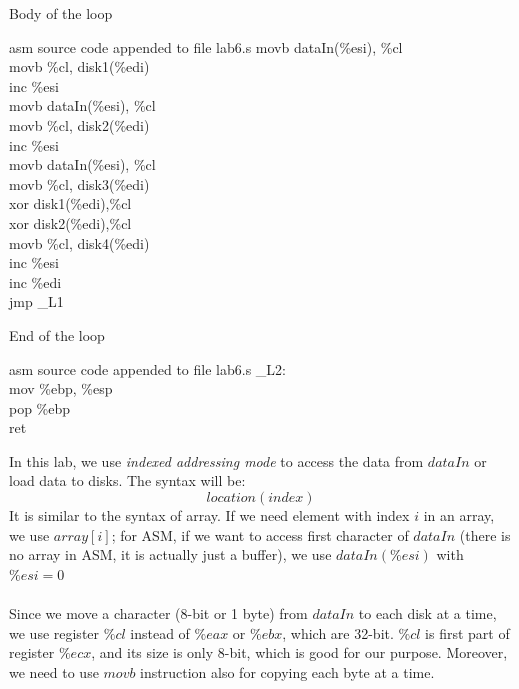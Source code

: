 \documentclass{article}
\begin{document}
\begin{multicols}{2}
Body of the loop
\begin{GFT}{asm source code appended to file lab6.s}
\+movb dataIn(\%esi), \%cl\\
\+movb \%cl, disk1(\%edi)\\
\+inc \%esi\\
\+movb dataIn(\%esi), \%cl\\
\+movb \%cl, disk2(\%edi)\\
\+inc \%esi\\
\+movb dataIn(\%esi), \%cl\\
\+movb \%cl, disk3(\%edi)\\
\+xor disk1(\%edi),\%cl\\
\+xor disk2(\%edi),\%cl\\
\+movb \%cl, disk4(\%edi)\\
\+inc \%esi\\
\+inc \%edi\\
\+jmp \_L1\\
\end{GFT}
End of the loop
\begin{GFT}{asm source code appended to file lab6.s}
\+\_L2:\\
\+mov \%ebp, \%esp\\
\+pop \%ebp\\
\+ret\\
\end{GFT}
\columnbreak
In this lab, we use \textit{indexed addressing mode} to access the data from $dataIn$ or load data to disks. The syntax will be: 
\[location(index)\]
It is similar to the syntax of array. If we need element with index $i$ in an array, we use $array[i]$; for ASM, if we want to access first character of $dataIn$ (there is no array in ASM, it is actually just a buffer), we use $dataIn(\%esi)$ with $\%esi = 0$ \\ \\
Since we move a character (8-bit or 1 byte) from $dataIn$ to each disk at a time, we use register $\%cl$ instead of $\%eax$ or $\%ebx$, which are 32-bit. $\%cl$ is first part of register $\%ecx$, and its size is only 8-bit, which is good for our purpose. Moreover, we need to use $movb$ instruction also for copying each byte at a time.
\end{multicols}
\clearpage
\end{document}
